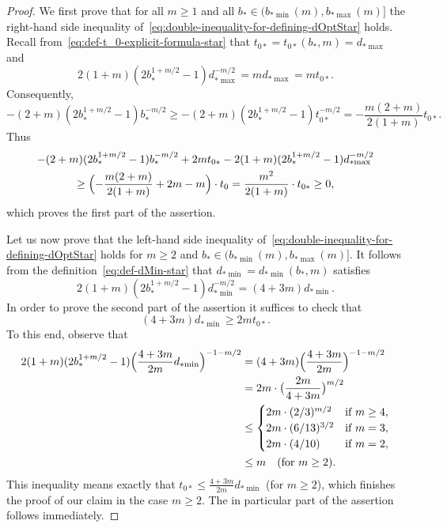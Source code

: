 \documentclass[a4paper]{amsart} %
\theoremstyle{definition}
\theoremstyle{remark}
\numberwithin{equation}{section}
\newcommand*{\bStar}{b_*}
\newcommand*{\tZeroStar}{t_{0*}}
\newcommand*{\bMinStar}{b_{*\!\min}}
\newcommand*{\bMaxStar}{b_{*\!\max}}
\newcommand*{\dMinStar}{d_{*\!\min}}
\newcommand*{\dMaxStar}{d_{*\!\max}}
\begin{document}
\begin{proof}
	We first prove that for all $m\geq 1$ and all $\bStar\in (\bMinStar(m), \bMaxStar(m)]$ the right-hand side inequality of~\eqref{eq:double-inequality-for-defining-dOptStar} holds.
	Recall from~\eqref{eq:def-t_0-explicit-formula-star} 
	that
	$\tZeroStar = \tZeroStar(\bStar,m) = \dMaxStar$
	and
	\begin{equation*}
	2(1+m)(2 \bStar^{1+m/2} -1) \dMaxStar^{-m/2} 
	=  m\dMaxStar =  m\tZeroStar.
	\end{equation*} 
	Consequently,
	\begin{equation*}
	-(2+m)(2\bStar^{1+m/2} - 1) \bStar^{-m/2} \geq  -(2+m)(2\bStar^{1+m/2} - 1) \tZeroStar^{-m/2} = -\frac{m(2+m)}{2(1+m)} \tZeroStar.
	\end{equation*} 
	Thus
	\begin{multline*}
	-(2+m)(2\bStar^{1+m/2} - 1) \bStar^{-m/2}  
	+ 2m \tZeroStar
	- 2(1+m)(2\bStar^{1+m/2} -1) \dMaxStar^{-m/2}\\
	\geq \Bigl(-\frac{m(2+m)}{2(1+m)} + 2m - m \Bigr)\cdot t_0 = \frac{m^2}{2(1+m)} \cdot \tZeroStar \geq 0,
	\end{multline*}
	which proves the first part of the assertion.
	
	Let us now prove  that the left-hand side inequality of~\eqref{eq:double-inequality-for-defining-dOptStar} holds 
	for $m\geq 2$ and $\bStar\in (\bMinStar(m), \bMaxStar(m)]$.
	It follows from the definition~\eqref{eq:def-dMin-star} 
	that  $\dMinStar = \dMinStar(\bStar,m)$ satisfies 
	\begin{equation*}
	2(1+m)(2 \bStar^{1+m/2} -1)\dMinStar^{-m/2}
	= (4+3m) \dMinStar.
	\end{equation*} 
	In order to prove the second part of the assertion  
	it suffices to check that
	\[
	(4+3m) \dMinStar \geq 2m \tZeroStar.
	\]
	To this end, observe that 
	\begin{align*}
	2(1+m)(2 \bStar^{1+m/2} -1)\Bigl( \frac{4+3m}{2m} \dMinStar\Bigr)^{-1-m/2}  
	&= (4+3m)\Bigl( \frac{4+3m}{2m} \Bigr)^{-1-m/2}\\
	&= 2m \cdot\bigl(\frac{2m}{4+3m} \bigr)^{m/2}\\
	&\leq 
	\begin{cases}
	2m \cdot (2/3)^{m/2} & \text{if } m\geq 4,\\
	2m\cdot (6/13)^{3/2} & \text{if } m = 3,\\
	2m \cdot (4/10) & \text{if } m=2,
	\end{cases}
	\\
	&\leq 
	m \quad \text{(for  $m\geq 2$)}.
	\end{align*}
	This inequality means exactly that $\tZeroStar \leq \frac{4+3m}{2m} \dMinStar$ (for $m\geq 2$),
	which finishes the proof of our claim in the case $m\geq 2$.
	The in particular part of the assertion follows immediately.
	

\end{proof}
\end{document}
